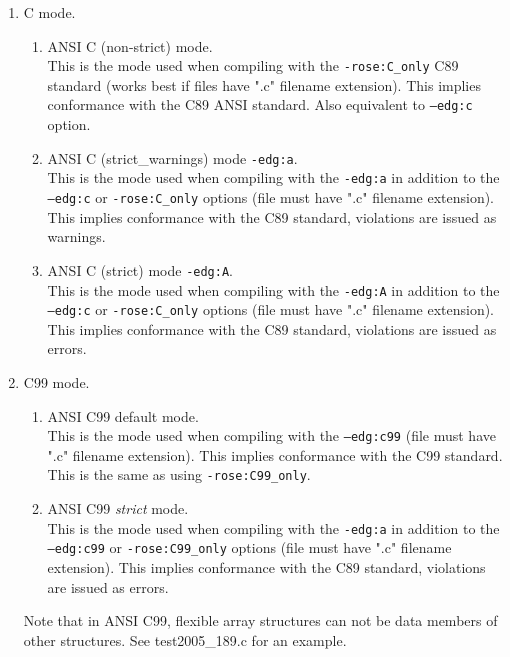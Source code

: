 \begin{enumerate}
   \item C mode. \\
   \begin{enumerate}
      \item ANSI C (non-strict) mode. \\
        This is the mode used when compiling with the {\tt -rose:C\_only} C89 standard 
        (works best if files have ".c" filename extension). This implies conformance with 
        the C89 ANSI standard. Also equivalent to {\tt --edg:c} option.
      \item ANSI C (strict\_warnings) mode {\tt -edg:a}. \\
        This is the mode used when compiling with the {\tt -edg:a} in addition to the 
        {\tt --edg:c} or {\tt -rose:C\_only} options (file must have ".c"
        filename extension).  This implies conformance with the C89 standard,
        violations are issued as warnings.
      \item ANSI C (strict) mode {\tt -edg:A}. \\
        This is the mode used when compiling with the {\tt -edg:A} in addition to the 
        {\tt --edg:c} or {\tt -rose:C\_only} options (file must have ".c"
        filename extension).  This implies conformance with the C89 standard,
        violations are issued as errors. 
   \end{enumerate}

   \item C99 mode. \\
   \begin{enumerate}
      \item ANSI C99 default mode. \\
        This is the mode used when compiling with the {\tt --edg:c99} (file must have ".c"
        filename extension). This implies conformance with the C99 standard. This is 
        the same as using {\tt -rose:C99\_only}.
      \item ANSI C99 {\em strict} mode. \\
        This is the mode used when compiling with the {\tt -edg:a} in addition to the 
        {\tt --edg:c99} or {\tt -rose:C99\_only} options (file must have ".c"
        filename extension).  This implies conformance with the C89 standard,
        violations are issued as errors.
   \end{enumerate}
   Note that in ANSI C99, flexible array structures can not be data members of 
   other structures. See test2005\_189.c for an example.


\end{enumerate}
